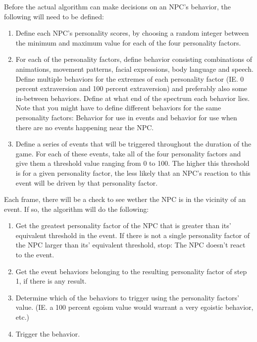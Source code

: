 \documentclass{article}
\begin{document}
    Before the actual algorithm can make decisions on an NPC's behavior, the following will need to be defined:

    \begin{enumerate}
    	\item Define each NPC's personality scores, by choosing a random integer between the minimum and maximum value for each of the four personality factors.
    	\item For each of the personality factors, define behavior consisting combinations of animations, movement patterns, facial expressions, body language and speech. Define multiple behaviors for the extremes of each personality factor (IE. 0 percent extraversion and 100 percent extraversion) and preferably also some in-between behaviors. Define at what end of the spectrum each behavior lies. Note that you might have to define different behaviors for the same personality factors: Behavior for use in events and behavior for use when there are no events happening near the NPC.%
    	\item Define a series of events that will be triggered throughout the duration of the game. For each of these events, take all of the four personality factors and give them a threshold value ranging from 0 to 100. The higher this threshold is for a given personality factor, the less likely that an NPC's reaction to this event will be driven by that personality factor.
    \end{enumerate}

    Each frame, there will be a check to see wether the NPC is in the vicinity of an event. If so, the algorithm will do the following:

    \begin{enumerate}
    	\item Get the greatest personality factor of the NPC that is greater than its' equivalent threshold in the event. If there is not a single personality factor of the NPC larger than its' equivalent threshold, stop: The NPC doesn't react to the event.
    	\item Get the event behaviors belonging to the resulting personality factor of step 1, if there is any result. 
    	\item Determine which of the behaviors to trigger using the personality factors' value. (IE. a 100 percent egoism value would warrant a very egoistic behavior, etc.)
    	\item Trigger the behavior.
    \end{enumerate}
\end{document}
